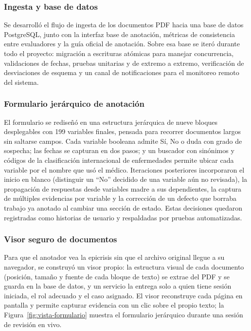\documentclass[12pt,letterpaper]{article}
\begin{document}
\subsubsection{Ingesta y base de datos}

Se desarrolló el flujo de ingesta de los documentos PDF hacia una base de datos PostgreSQL, junto con la interfaz base de anotación, métricas de consistencia entre evaluadores y la guía oficial de anotación. Sobre esa base se iteró durante todo el proyecto: migración a escrituras atómicas para manejar concurrencia, validaciones de fechas, pruebas unitarias y de extremo a extremo, verificación de desviaciones de esquema y un canal de notificaciones para el monitoreo remoto del sistema.

\subsubsection{Formulario jerárquico de anotación}

El formulario se rediseñó en una estructura jerárquica de nueve bloques desplegables con 199 variables finales, pensada para recorrer documentos largos sin saltarse campos. Cada variable booleana admite Sí, No o duda con grado de sospecha; las fechas se capturan en dos pasos; y un buscador con sinónimos y códigos de la clasificación internacional de enfermedades permite ubicar cada variable por el nombre que usó el médico. Iteraciones posteriores incorporaron el inicio en blanco (distinguir un ``No'' decidido de una variable aún no revisada), la propagación de respuestas desde variables madre a sus dependientes, la captura de múltiples evidencias por variable y la corrección de un defecto que borraba trabajo ya anotado al cambiar una sección de estado. Estas decisiones quedaron registradas como historias de usuario y respaldadas por pruebas automatizadas.

\subsubsection{Visor seguro de documentos}

Para que el anotador vea la epicrisis sin que el archivo original llegue a su navegador, se construyó un visor propio: la estructura visual de cada documento (posición, tamaño y fuente de cada bloque de texto) se extrae del PDF y se guarda en la base de datos, y un servicio la entrega solo a quien tiene sesión iniciada, el rol adecuado y el caso asignado. El visor reconstruye cada página en pantalla y permite capturar evidencia con un clic sobre el propio texto; la Figura~\ref{fig:vista-formulario} muestra el formulario jerárquico durante una sesión de revisión en vivo.
\end{document}
